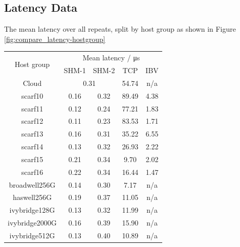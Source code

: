 \documentclass{article}
\begin{document}
    \clearpage

    \subsection{Latency Data}
        \label{appendix:latency-data}

        \begin{center}
            \centering
            \captionsetup{type=table}
            \caption{The mean latency over all repeats, split by host group as shown in Figure \ref{fig:compare_latency-hostgroup}}
            \begin{tabular}{ |c||c|c|c|c|  }
             \hline
             \multirow{2}{*}{Host group} & \multicolumn{4}{c|}{Mean latency / \si{\micro\second}} \\
             \cline{2-5}
                                      & SHM-1 & SHM-2 & TCP & IBV\\
             \hline
                Cloud & \multicolumn{2}{c|}{0.31} & 54.74 & n/a\\
                scarf10 & 0.16 & 0.32 & 89.49 & 4.38\\
                scarf11 & 0.12 & 0.24 & 77.21 & 1.83\\
                scarf12 & 0.11 & 0.23 & 83.53 & 1.71\\
                scarf13 & 0.16 & 0.31 & 35.22 & 6.55\\
                scarf14 & 0.13 & 0.32 & 26.93 & 2.22\\
                scarf15 & 0.21 & 0.34 & 9.70 & 2.02\\
                scarf16 & 0.22 & 0.34 & 16.44 & 1.47\\
                broadwell256G & 0.14 & 0.30 & 7.17 & n/a\\
                haswell256G & 0.19 & 0.37 & 11.05 & n/a\\
                ivybridge128G & 0.13 & 0.32 & 11.99 & n/a\\
                ivybridge2000G & 0.16 & 0.39 & 15.90 & n/a\\
                ivybridge512G & 0.13 & 0.40 & 10.89 & n/a\\

             \hline
            \end{tabular}

        \end{center}
\end{document}
